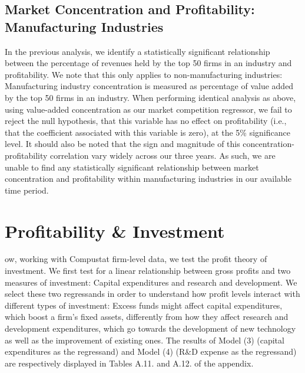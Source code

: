 \subsection{Market Concentration and Profitability: Manufacturing Industries}


In the previous analysis, we identify a statistically significant relationship between the percentage of revenues held by the top 50 firms in an industry and profitability. We note that this only applies to non-manufacturing industries: Manufacturing industry concentration is measured as percentage of value added by the top 50 firms in an industry. When performing identical analysis as above, using value-added concentration as our market competition regressor, we fail to reject the null hypothesis, that this variable has no effect on profitability (i.e., that the coefficient associated with this variable is zero), at the 5\% significance level. It should also be noted that the sign and magnitude of this concentration-profitability correlation vary widely across our three years. As such, we are unable to find any statistically significant relationship between market concentration and profitability within manufacturing industries in our available time period. 

\section{Profitability \& Investment}
\label{sec:sec06}

ow, working with Compustat firm-level data, we test the profit theory of investment. We first test for a linear relationship between gross profits and two measures of investment: Capital expenditures and research and development. We select these two regressands in order to understand how profit levels interact with different types of investment: Excess funds might affect capital expenditures, which boost a firm’s fixed assets, differently from how they affect research and development expenditures, which go towards the development of new technology as well as the improvement of existing ones. The results of Model (3) (capital expenditures as the regressand) and Model (4) (R\&D expense as the regressand) are respectively displayed in Tables A.11. and A.12. of the appendix.

